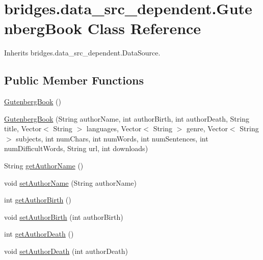 \hypertarget{classbridges_1_1data__src__dependent_1_1_gutenberg_book}{}\section{bridges.\+data\+\_\+src\+\_\+dependent.\+Gutenberg\+Book Class Reference}
\label{classbridges_1_1data__src__dependent_1_1_gutenberg_book}


Inherits bridges.\+data\+\_\+src\+\_\+dependent.\+Data\+Source.

\subsection*{Public Member Functions}
\begin{DoxyCompactItemize}
\item 
\hyperlink{classbridges_1_1data__src__dependent_1_1_gutenberg_book_a34e237fe23613dad17e4b5e005077927}{Gutenberg\+Book} ()
\item 
\hyperlink{classbridges_1_1data__src__dependent_1_1_gutenberg_book_ab35292d8e1464ce388326cafe29ed713}{Gutenberg\+Book} (String author\+Name, int author\+Birth, int author\+Death, String title, Vector$<$ String $>$ languages, Vector$<$ String $>$ genre, Vector$<$ String $>$ subjects, int num\+Chars, int num\+Words, int num\+Sentences, int num\+Difficult\+Words, String url, int downloads)
\item 
String \hyperlink{classbridges_1_1data__src__dependent_1_1_gutenberg_book_a8f66ba5bea27dbecb1658add3a278e45}{get\+Author\+Name} ()
\item 
void \hyperlink{classbridges_1_1data__src__dependent_1_1_gutenberg_book_a6d6e1ccac0fc2e0b09aa6ac6fbe727bc}{set\+Author\+Name} (String author\+Name)
\item 
int \hyperlink{classbridges_1_1data__src__dependent_1_1_gutenberg_book_a00e6f487af339abaa5eb83d315abc3c6}{get\+Author\+Birth} ()
\item 
void \hyperlink{classbridges_1_1data__src__dependent_1_1_gutenberg_book_ad54dbb22312e98761ae3d19f3b94ff85}{set\+Author\+Birth} (int author\+Birth)
\item 
int \hyperlink{classbridges_1_1data__src__dependent_1_1_gutenberg_book_aa1b308207d35f65ceaf85a6bc919d0da}{get\+Author\+Death} ()
\item 
void \hyperlink{classbridges_1_1data__src__dependent_1_1_gutenberg_book_af9aef84c74d681c1a41cbc37698ced18}{set\+Author\+Death} (int author\+Death)

\end{DoxyCompactItemize}
